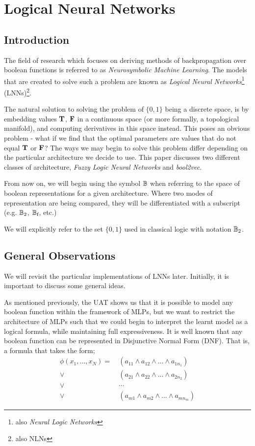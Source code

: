 \documentclass[conference]{report}
\begin{document}
\chapter{Logical Neural Networks}

\section{Introduction}

The field of research which focuses on deriving methods of backpropagation over boolean functions is referred to as \textit{Neurosymbolic Machine Learning}. The models that are created to solve such a problem are known as \textit{Logical Neural Networks}\footnote{also \textit{Neural Logic Networks}} (LNNs)\footnote{also NLNs}. 

The natural solution to solving the problem of $\{0,1\}$ being a discrete space, is by embedding values $\textbf{T}$, $\textbf{F}$ in a continuous space (or more formally, a topological manifold), and computing derivatives in this space instead. This poses an obvious problem - what if we find that the optimal parameters are values that do not equal $\textbf{T}$ or $\textbf{F}$? The ways we may begin to solve this problem differ depending on the particular architecture we decide to use. This paper discusses two different classes of architecture, \textit{Fuzzy Logic Neural Networks} and \textit{bool2vec}.

From now on, we will begin using the symbol $\mathbb{B}$ when referring to the space of boolean representations for a given architecture. Where two modes of representation are being compared, they will be differentiated with a subscript (e.g. $\mathbb{B}_2$, $\mathbb{B}_\text{f}$, etc.)

We will explicitly refer to the set $\{0,1\}$ used in classical logic with notation $\mathbb{B}_2$.

\section{General Observations}

We will revisit the particular implementations of LNNs later. Initially, it is important to discuss some general ideas.

As mentioned previously, the UAT shows us that it is possible to model any boolean function within the framework of MLPs, but we want to restrict the architecture of MLPs such that we could begin to interpret the learnt model as a logical formula, while maintaining full expressiveness. It is well known that any boolean function can be represented in Disjunctive Normal Form (DNF). That is, a formula that takes the form;
$$
\begin{aligned}
\phi(x_1, \dots, x_N) =\ &(a_{11} \land a_{12} \land \dots \land a_{1n_1}) \\
\lor\ &(a_{21} \land a_{22} \land \dots \land a_{2n_2}) \\ 
\lor\ &\cdots \\
\lor\ &(a_{m1} \land a_{m2} \land \dots \land a_{mn_m})
\end{aligned}
$$
\end{document}
